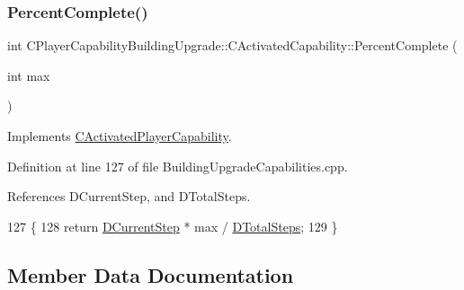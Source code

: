 \hypertarget{classCPlayerCapabilityBuildingUpgrade_1_1CActivatedCapability_afb2aab171773fa9f33539e33315c1c28}{}\label{classCPlayerCapabilityBuildingUpgrade_1_1CActivatedCapability_afb2aab171773fa9f33539e33315c1c28} 
\subsubsection{\texorpdfstring{Percent\+Complete()}{PercentComplete()}}
{\footnotesize\ttfamily int C\+Player\+Capability\+Building\+Upgrade\+::\+C\+Activated\+Capability\+::\+Percent\+Complete (\begin{DoxyParamCaption}\item[{int}]{max }\end{DoxyParamCaption})\hspace{0.3cm}{\ttfamily [virtual]}}



Implements \hyperlink{classCActivatedPlayerCapability_a405dc6076058006a4f801727de4cfe4d}{C\+Activated\+Player\+Capability}.



Definition at line 127 of file Building\+Upgrade\+Capabilities.\+cpp.



References D\+Current\+Step, and D\+Total\+Steps.


\begin{DoxyCode}
127                                                                                 \{
128     \textcolor{keywordflow}{return} \hyperlink{classCPlayerCapabilityBuildingUpgrade_1_1CActivatedCapability_a70e4e67d8115643f7ffa11dc72fcf63c}{DCurrentStep} * max / \hyperlink{classCPlayerCapabilityBuildingUpgrade_1_1CActivatedCapability_a9c4ea12cf99701f8ce38e17e03ad0115}{DTotalSteps};
129 \}
\end{DoxyCode}


\subsection{Member Data Documentation}
\hypertarget{classCPlayerCapabilityBuildingUpgrade_1_1CActivatedCapability_a70e4e67d8115643f7ffa11dc72fcf63c}{}\label{classCPlayerCapabilityBuildingUpgrade_1_1CActivatedCapability_a70e4e67d8115643f7ffa11dc72fcf63c} 
